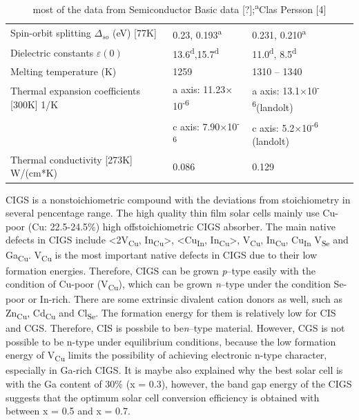 \documentclass[a4paper, 12pt, titlepage,oneside,drop]{kthesis}
\begin{document}
\begin {table}[!htb]
\begin{tabular}{l l l}
\rowcolor[gray]{0.9}
Spin-orbit splitting $\Delta_{so}$ (eV) [77K] & 0.23, 0.193\textsuperscript{a} & 0.231, 0.210\textsuperscript{a} \\ 
Dielectric constants $\varepsilon(0)$ & 13.6\textsuperscript{d},15.7\textsuperscript{d} & 11.0\textsuperscript{d}, 8.5\textsuperscript{d}\\
\rowcolor[gray]{0.9}
Melting temperature (K)& 1259 & 1310 -- 1340\\
Thermal expansion coefficients [300K] 1/K & a axis: 11.23$\times$10\textsuperscript{-6}& a axis: 13.1$\times$10\textsuperscript{-6}(landolt)\\
& c axis: 7.90$\times$10\textsuperscript{-6}&c axis: 5.2$\times$10\textsuperscript{-6} (landolt)\\ 
\rowcolor[gray]{0.9}
Thermal conductivity [273K] W/(cm*K)& 0.086 & 0.129 \\ 
\bottomrule
\end{tabular}
\caption {most of the data from Semiconductor Basic data [?];\textsuperscript{a}Clas Persson [4]}
\label{kth518}
\end{table}




CIGS is a nonstoichiometric compound with the deviations from stoichiometry in several pencentage range. The high quality thin film solar cells mainly use Cu-poor (Cu: 22.5-24.5\%) high offstoichiometric CIGS absorber.
The main native defects in CIGS include <2V\textsubscript{Cu}, In\textsubscript{Cu}>, <Cu\textsubscript{In}, In\textsubscript{Cu}>, V\textsubscript{Cu}, In\textsubscript{Cu}, Cu\textsubscript{In} V\textsubscript{Se}
and Ga\textsubscript{Cu}. V\textsubscript{Cu} is the most important native defects in CIGS due to their low formation energies. Therefore, CIGS can be grown \textit{p}--type easily with the condition of Cu-poor (V\textsubscript{Cu}),
which can be grown \textit{n}--type under the condition Se-poor or In-rich. There are some extrinsic divalent cation donors as well, such as Zn\textsubscript{Cu}, Cd\textsubscript{Cu} and Cl\textsubscript{Se}. The formation energy 
for them is relatively low for CIS and CGS. Therefore, CIS is possbile to be\textit{n}--type material. However, CGS is not possible to be n-type under equilibrium conditions, because the low formation energy of V\textsubscript{Cu} limits the possibility of achieving electronic n-type character,
especially in Ga-rich CIGS. It is maybe also explained why the best solar cell is with the Ga content of 30\% (x = 0.3), however, the band gap energy of the CIGS suggests that the optimum solar cell conversion efficiency is obtained 
with between x = 0.5 and x = 0.7.
\end{document}
